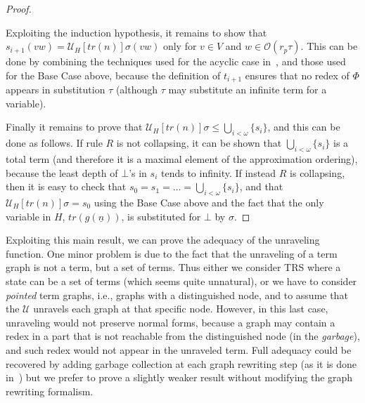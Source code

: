 \documentclass{eptcs}
\theoremstyle{plain}
\theoremstyle{definition}
\begin{document}
\begin{proof}
\begin{description}
\noindent
Exploiting the induction hypothesis, it remains to show that 
$s_{i+1}(vw) = \mathcal{U}_H[tr(n)]\sigma(vw)$ only for $v \in V$ and $w 
\in \mathcal{O}(r_p\tau)$. This can be done by combining the techniques 
used for the acyclic case in~\cite{HP:ITRJ,CR:HRJR}, and those used for the 
Base Case above, because the definition of $t_{i+1}$ ensures 
that no redex of $\Phi$ appears in substitution $\tau$ (although 
$\tau$ 
may substitute an infinite term for a variable).

\end{description}

\noindent 
Finally it remains to prove that $\mathcal{U}_H[tr(n)]\sigma \leq 
\bigcup_{i< \omega} \{s_i\}$, and this can be done as follows. If rule 
$R$ is not collapsing, it can be shown that $\bigcup_{i< \omega} 
\{s_i\}$ is a total term (and therefore it is a maximal element of the
approximation ordering), because the least depth of $\bot$'s in $s_i$ 
tends to infinity. If instead $R$ is collapsing, then it is easy to 
check that $s_0 = s_1 = \ldots = \bigcup_{i< \omega} \{s_i\}$, and 
that $\mathcal{U}_H[tr(n)]\sigma = s_0$ using the Base Case above and the 
fact that the only variable in $H$, $tr(g(\underline{n}))$, is 
substituted for $\bot$ by $\sigma$. 
\end{proof}

Exploiting this main result, we can prove the adequacy of the 
unraveling function. One minor problem is due to the fact that the 
unraveling of a term graph is not a term, but a set of terms. Thus 
either we consider TRS where a state can be a set of terms (which 
seems quite unnatural), or we have to consider {\em pointed} term 
graphs, i.e., graphs with a distinguished node, and to assume that the 
$\mathcal{U}$ unravels each graph at that specific node. However, in this 
last case, unraveling would not preserve normal forms, because a graph 
may contain a redex in a part that is not reachable from the 
distinguished node (in the {\em garbage}), and such redex would not 
appear in the unraveled term. Full adequacy could be recovered by 
adding garbage collection at each graph rewriting step (as it is done 
in~\cite{BEGKPS:TGR,KKSV:AGRS}) but we prefer to prove a 
slightly weaker result without modifying the graph rewriting formalism.
\end{document}
